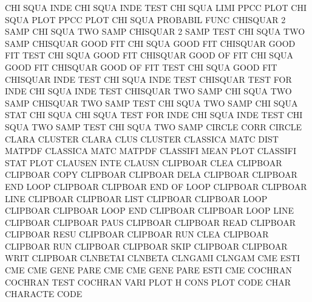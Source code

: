 CHI      SQUA INDE                      CHI      SQUA INDE TEST
CHI      SQUA LIMI                      PPCC     PLOT
CHI      SQUA PLOT                      PPCC     PLOT
CHI      SQUA                           PROBABIL FUNC
CHISQUAR 2    SAMP                      CHI      SQUA TWO  SAMP
CHISQUAR 2    SAMP TEST                 CHI      SQUA TWO  SAMP
CHISQUAR GOOD FIT                       CHI      SQUA GOOD FIT
CHISQUAR GOOD FIT  TEST                 CHI      SQUA GOOD FIT
CHISQUAR GOOD OF   FIT                  CHI      SQUA GOOD FIT
CHISQUAR GOOD OF   FIT  TEST            CHI      SQUA GOOD FIT
CHISQUAR INDE TEST                      CHI      SQUA INDE TEST
CHISQUAR TEST FOR  INDE                 CHI      SQUA INDE TEST
CHISQUAR TWO  SAMP                      CHI      SQUA TWO  SAMP
CHISQUAR TWO  SAMP TEST                 CHI      SQUA TWO  SAMP
CHI      SQUA STAT                      CHI      SQUA
CHI      SQUA TEST FOR  INDE            CHI      SQUA INDE TEST
CHI      SQUA TWO  SAMP TEST            CHI      SQUA TWO  SAMP
CIRCLE   CORR                           CIRCLE
CLARA                                   CLUSTER
CLARA    CLUS                           CLUSTER
CLASSICA MATC DIST                      MATPDF
CLASSICA MATC                           MATPDF
CLASSIFI MEAN PLOT                      CLASSIFI STAT PLOT
CLAUSEN  INTE                           CLAUSN
CLIPBOAR CLEA                           CLIPBOAR
CLIPBOAR COPY                           CLIPBOAR
CLIPBOAR DELA                           CLIPBOAR
CLIPBOAR END  LOOP                      CLIPBOAR
CLIPBOAR END  OF   LOOP                 CLIPBOAR
CLIPBOAR LINE                           CLIPBOAR
CLIPBOAR LIST                           CLIPBOAR
CLIPBOAR LOOP                           CLIPBOAR
CLIPBOAR LOOP END                       CLIPBOAR
CLIPBOAR LOOP LINE                      CLIPBOAR
CLIPBOAR PAUS                           CLIPBOAR
CLIPBOAR READ                           CLIPBOAR
CLIPBOAR RESU                           CLIPBOAR
CLIPBOAR RUN  CLEA                      CLIPBOAR
CLIPBOAR RUN                            CLIPBOAR
CLIPBOAR SKIP                           CLIPBOAR
CLIPBOAR WRIT                           CLIPBOAR
CLNBETAI                                CLNBETA
CLNGAMI                                 CLNGAM
CME      ESTI                           CME
CME      GENE PARE                      CME
CME      GENE PARE ESTI                 CME
COCHRAN                                 COCHRAN  TEST
COCHRAN  VARI PLOT                      H        CONS PLOT
CODE     CHAR                           CHARACTE CODE
